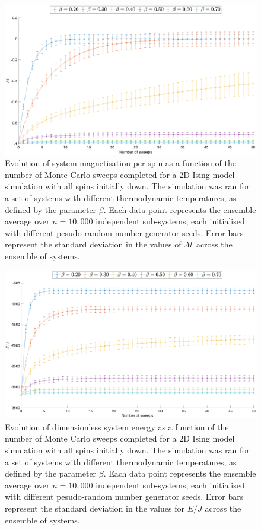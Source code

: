 \documentclass[11pt]{iopart}
\begin{document}
\begin{figure}[t]
  \centering
  \includegraphics[width=0.9\linewidth]{images/section1/magnetisationfinal.png}
  \caption{Evolution of system magnetisation per spin as a function of the number of Monte Carlo sweeps completed for a 2D Ising model simulation with all spins initially down. The simulation was ran for a set of systems with different thermodynamic temperatures, as defined by the parameter $\beta$. Each data point represents the ensemble average over $n = 10,000$ independent sub-systems, each initialised with different pesudo-random number generator seeds. Error bars represent the standard deviation in the values of $\mathcal{M}$ across the ensemble of systems.}
  \label{fig:magnetisationconvergence}
\end{figure}

\begin{figure}[b]
  \centering
  \includegraphics[width=0.9\linewidth]{images/section1/energyfinal.png}
  \caption{Evolution of dimensionless system energy as a function of the number of Monte Carlo sweeps completed for a 2D Ising model simulation with all spins initially down. The simulation was ran for a set of systems with different thermodynamic temperatures, as defined by the parameter $\beta$. Each data point represents the ensemble average over $n = 10,000$ independent sub-systems, each initialised with different pesudo-random number generator seeds. Error bars represent the standard deviation in the values for $E/J$ across the ensemble of systems.}
  \label{fig:energyconvergence}
\end{figure}
\end{document}
